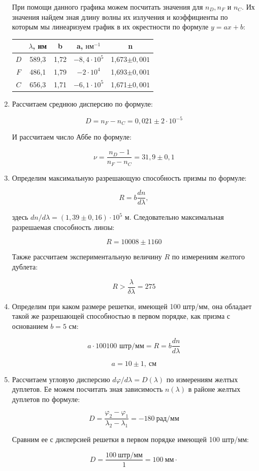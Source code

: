 \documentclass[a4paper, 12pt]{article}%
\begin{document}
\begin{enumerate}
При помощи данного графика можем посчитать значения для $n_D, n_F$ и $n_C$. Их значения найдем зная длину волны их излучения и коэффициенты по которым мы линеаризуем график в их окрестности по формуле $y = ax + b$:

\begin{center}
\begin{tabular}{|c|c|c|c|c|}
\hline 
 & $\lambda$, нм & b & a, $\text{нм}^{-1}$ & n \\ 
\hline 
$D$ & 589,3 & 1,72 & $-8,4\cdot 10^5$ & 1,673$\pm 0,001$ \\ 
\hline 
$F$ & 486,1 & 1,79 & $-2\cdot 10^4$ & 1,693$\pm 0,001$ \\ 
\hline 
$C$ & 656,3 & 1,71 & $-6,1\cdot 10^5$ & 1,671$\pm 0,001$ \\ 
\hline 
\end{tabular} 
\end{center}

\item Рассчитаем среднюю дисперсию по формуле:

\[D = n_F - n_C = 0,021 \pm 2\cdot 10^{-5}\]

И рассчитаем число Аббе по формуле:

\[\nu = \frac{n_D - 1}{n_F - n_C} = 31,9 \pm 0,1\]

\item Определим максимальную разрешающую способность призмы по формуле:

\[R = b \frac{dn}{d\lambda},\]

здесь $dn/d\lambda = (1,39 \pm 0,16) \cdot 10^5$ м. Следовательно максимальная разрешаемая способность линзы:

\[R = 10008 \pm 1160\]

Также рассчитаем экспериментальную величину $R$ по измерениям желтого дублета:

\[R > \frac{\lambda}{\delta\lambda} = 275\]

\item Определим при каком размере решетки, имеющей 100 штр/мм, она обладает такой же разрешающей способностью в первом порядке, как призма с основанием $b = 5$ см:

\[a \cdot 100 \text{100 штр/мм} = R = b \frac{dn}{d\lambda}\]

\[a = 10 \pm 1, \: \text{см}\]

\item Рассчитаем угловую дисперсию $d\varphi / d\lambda = D(\lambda )$ по измерениям желтых дуплетов. Ее можем посчитать зная зависимость $n(\lambda)$ в районе желтых дуплетов по формуле:

\[D = \frac{\varphi_2 - \varphi_1}{\lambda_2 - \lambda_1} = -180  \: \text{рад/мм}\]

Сравним ее с дисперсией решетки в первом порядке имеющей 100 штр/мм:

\[D = \frac{100 \: \text{штр/мм}}{1} = 100 \: \text{мм}\cdot\]

\end{enumerate}
\end{document}
